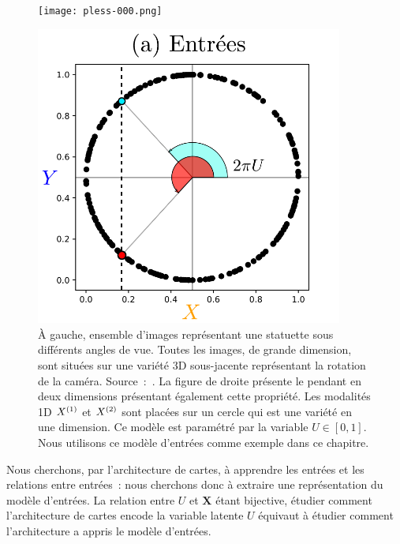 \documentclass[../main]{subfiles}
\begin{document}
\begin{figure}
    \begin{minipage}{0.4\textwidth}
    \centering
    \texttt{[image: pless-000.png]}
    \end{minipage}
    \begin{minipage}{0.6\textwidth}
    \centering
    \includegraphics[width=0.9\textwidth]{2som_inp.pdf}
    \end{minipage}
    \caption{
        \`A gauche, ensemble d'images représentant une statuette sous différents angles de vue. Toutes les images, de grande dimension, sont situées sur une variété 3D sous-jacente représentant la rotation de la caméra. Source~:~\cite{Pless2009ASO}.
       La figure de droite présente le pendant en deux dimensions présentant également cette propriété. Les modalités 1D $X^{({1})}$ et $X^{({2})}$ sont placées sur un cercle qui est une variété en une dimension. Ce modèle est paramétré par la variable $U \in [0,1]$. Nous utilisons ce modèle d'entrées comme exemple dans ce chapitre.
       \label{fig:U}}
\end{figure}

Nous cherchons, par l'architecture de cartes, à apprendre les entrées et les relations entre entrées~: nous cherchons donc à extraire une représentation du modèle d'entrées. La relation entre $U$ et $\mathbf{X}$ étant bijective, étudier comment l'architecture de cartes encode la variable latente $U$ équivaut à étudier comment l'architecture a appris le modèle d'entrées.
\end{document}
